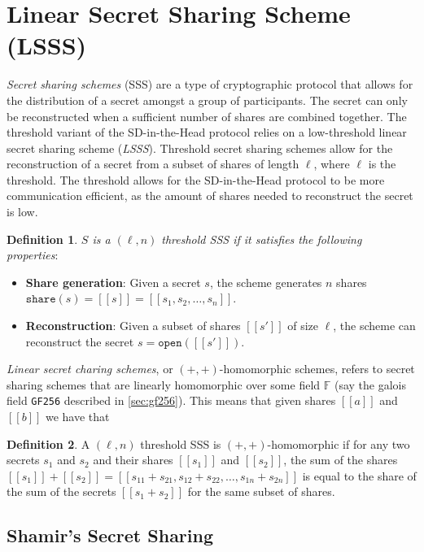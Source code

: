 \documentclass[twoside,11pt,openright]{report}
\theoremstyle{definition}
\newtheorem{definition}{Definition}[section]
\theoremstyle{plain}
\begin{document}
\section{Linear Secret Sharing Scheme (LSSS)}
\label{sec:sss}

\textit{Secret sharing schemes} (SSS) are a type of cryptographic protocol that allows for the distribution of a secret amongst a group of participants. The secret can only be reconstructed when a sufficient number of shares are combined together. The threshold variant of the SD-in-the-Head protocol relies on a low-threshold linear secret sharing scheme (\textit{LSSS}). Threshold secret sharing schemes allow for the reconstruction of a secret from a subset of shares of length $\ell$, where $\ell$ is the threshold. The threshold allows for the SD-in-the-Head protocol to be more communication efficient, as the amount of shares needed to reconstruct the secret is low.

\begin{definition}
  \label{def:sss}
  \textit{$S$ is a $(\ell,n)$ threshold SSS if it satisfies the following properties}:

  \begin{itemize}
    \item \textbf{Share generation}: Given a secret $s$, the scheme generates $n$ shares $\texttt{share}(s) = [[s]] = [[s_1, s_2, \dots, s_n]]$.
    \item \textbf{Reconstruction}: Given a subset of shares $[[s']]$ of size $\ell$, the scheme can reconstruct the secret $s = \texttt{open}([[s']])$.
  \end{itemize}

\end{definition}

\textit{Linear secret charing schemes}, or $(+,+)$-homomorphic schemes, refers to secret sharing schemes that are linearly homomorphic over some field $\mathbb{F}$ (say the galois field \texttt{GF256} described in \autoref{sec:gf256}). This means that given shares $[[a]]$ and $[[b]]$ we have that
\begin{definition}
  A $(\ell,n)$ threshold SSS is $(+,+)$-homomorphic if for any two secrets $s_1$ and $s_2$ and their shares $[[s_1]]$ and $[[s_2]]$, the sum of the shares $[[s_1]] + [[s_2]] = [[s_{11} + s_{21}, s_{12} + s_{22}, \dots, s_{1n} + s_{2n}]]$ is equal to the share of the sum of the secrets $[[s_1 + s_2]]$ for the same subset of shares.
\end{definition}
\subsection{Shamir's Secret Sharing}
\label{sec:shamir}
\end{document}
